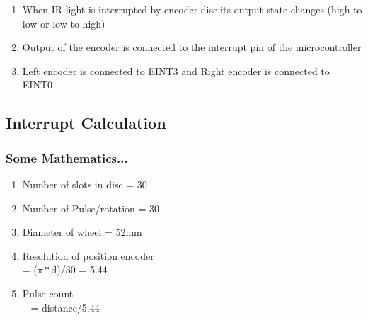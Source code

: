 \documentclass[table,10pt,red]{beamer}
\begin{document}
\begin{frame}[shrink = 8.9]
\begin{minipage}[c]{0.5\textwidth}
\begin{enumerate}
					\item <+-|alert@+> When IR light is interrupted by encoder disc,its output state changes (high to low or low to high)\\[5pt]
					\item <+-|alert@+> Output of the encoder is connected to the interrupt pin of the microcontroller\\[5pt]
					\item <+-|alert@+> Left encoder is connected to EINT3 and  Right encoder is connected to EINT0 \\[5pt]
				\end{enumerate}
			\end{minipage}
	\end{frame}
	
\subsection{Interrupt Calculation}
	\begin{frame}
		\frametitle{Some Mathematics...}\pause
			\begin{enumerate}
				\item <+-|alert@+> Number of slots in disc \color{red}= 30 \color{black}\\[10pt]
				\item <+-|alert@+> Number of Pulse/rotation \color{red} = 30 \color{black}\\[10pt]
				\item <+-|alert@+> Diameter of wheel \color{red} = 52mm \color{black} \\[10pt]
				\item <+-|alert@+> Resolution of position encoder \\[5pt] \pause 
					\hspace{50pt}	\color{red} = ($\pi*$d)/30 = 5.44 \color{black}	\pause		
				\item <+-|alert@+> Pulse count \\[10pt]\
					\hspace{50pt}	\color{red} = distance/5.44 \color{black}
			\end{enumerate}
	\end{frame}
	
\end{document}
